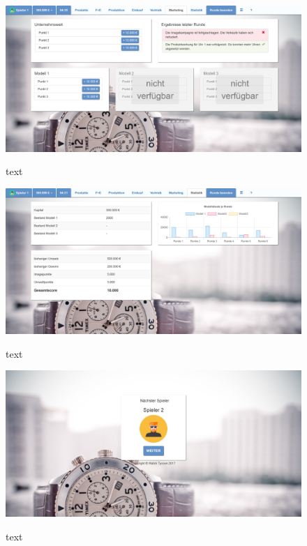 \begin{figure} 
	\centering
	\includegraphics[scale=0.1]{img/bilder_layout/MockUp9.jpg}
	\label{key}
	\caption{text} 
\end{figure}
\begin{figure} 
	\centering
	\includegraphics[scale=0.1]{img/bilder_layout/MockUp5.jpg}
	\label{key}
	\caption{text} 
\end{figure}
\begin{figure} 
	\centering
	\includegraphics[scale=0.1]{img/bilder_layout/MockUp8.jpg} \label{key}
	\caption{text} 
\end{figure}

\clearpage
